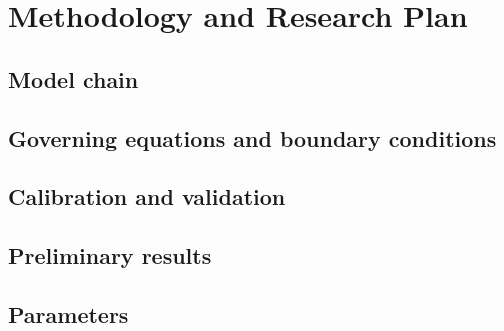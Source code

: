 
\chapter{Methodology and Research Plan}
\label{chap:methods}

\section{Model chain}

\section{Governing equations and boundary conditions}

\section{Calibration and validation}

\section{Preliminary results}

\section{Parameters}
